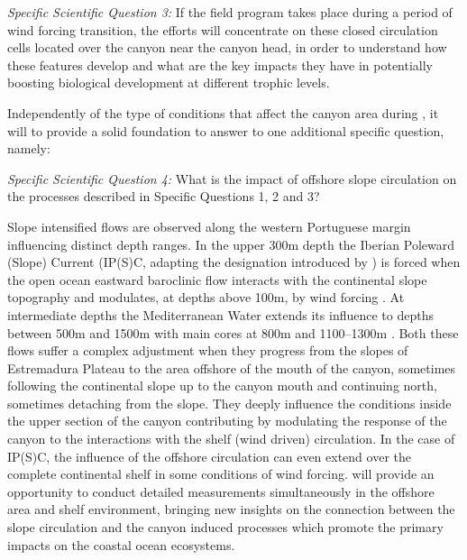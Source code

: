 \textsl{Specific Scientific Question 3:} If the \proj field program
takes place during a period of wind forcing transition, the efforts
will concentrate on these closed circulation cells located over the
canyon near the canyon head, in order to understand how these features
develop and what are the key impacts they have in potentially boosting
biological development at different trophic levels.

Independently of the type of conditions that affect the \naz canyon
area during \proje, it will to provide a solid foundation to answer to
one additional specific question, namely:

\textsl{Specific Scientific Question 4:} What is the impact of
offshore slope circulation on the processes described in Specific
Questions 1, 2 and 3?

Slope intensified flows are observed along the western Portuguese
margin influencing distinct depth ranges. In the upper 300m depth the
Iberian Poleward (Slope) Current (IP(S)C, adapting the designation
introduced by \cite{peliz03}) is forced when the open ocean eastward
baroclinic flow interacts with the continental slope topography and
modulates, at depths above 100m, by wind forcing
\cite{frouin90,haynes90}. At intermediate depths the Mediterranean
Water extends its influence to depths between 500m and 1500m with main
cores at 800m and 1100--1300m \cite{fiuza98}. Both these flows suffer
a complex adjustment when they progress from the slopes of Estremadura
Plateau to the area offshore of the mouth of the \naz canyon,
sometimes following the continental slope up to the canyon mouth and
continuing north, sometimes detaching from the slope. They deeply
influence the conditions inside the upper section of the canyon
contributing by modulating the response of the canyon to the
interactions with the shelf (wind driven) circulation. In the case of
IP(S)C, the influence of the offshore circulation can even extend over
the complete continental shelf in some conditions of wind
forcing. \proj will provide an opportunity to conduct detailed
measurements simultaneously in the offshore area and shelf
environment, bringing new insights on the connection between the slope
circulation and the canyon induced processes which promote the primary
impacts on the coastal ocean ecosystems.

\par

